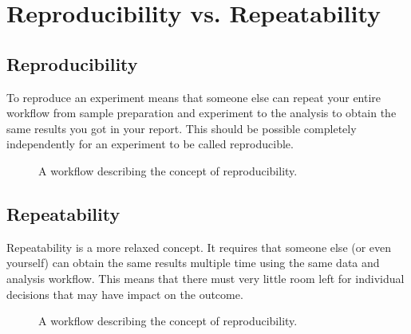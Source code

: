 \documentclass[letterpaper,10pt,english]{sphinxmanual}
\begin{document}
\section{Reproducibility vs. Repeatability}
\label{\detokenize{01-Introduction:reproducibility-vs-repeatability}}

\subsection{Reproducibility}
\label{\detokenize{01-Introduction:reproducibility}}
\sphinxAtStartPar
To reproduce an experiment means that someone else can repeat your entire workflow from sample preparation and experiment to the analysis to obtain the same results you got in your report. This should be possible completely independently for an experiment to be called reproducible.

\begin{figure}[htbp]
\centering
\capstart

\noindent{}
\caption{A workflow describing the concept of reproducibility.}\label{\detokenize{01-Introduction:id22}}\end{figure}




\subsection{Repeatability}
\label{\detokenize{01-Introduction:repeatability}}
\sphinxAtStartPar
Repeatability is a more relaxed concept. It requires that someone else (or even yourself) can obtain the same results multiple time using the same data and analysis workflow. This means that there must very little room left for individual decisions that may have impact on the outcome.

\begin{figure}[htbp]
\centering
\capstart

\noindent{}
\caption{A workflow describing the concept of reproducibility.}\label{\detokenize{01-Introduction:id23}}\end{figure}
\end{document}
